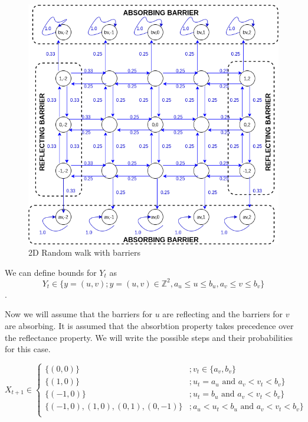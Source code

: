 \documentclass[a4paper]{article}
\begin{document}
\begin{figure}[h]
    \centering
    \includegraphics[width=\textwidth]{2d-bounded.png}
    \caption{2D Random walk with barriers}
    \label{fig:2d-bounded}
\end{figure}

We can define bounds for $Y_t$ as
$$Y_t \in \{y=(u,v); y=(u,v) \in \mathbb{Z}^2, a_u\leq u \leq b_u, a_v \leq v \leq b_v\}$$. 

Now we will assume that the barriers for $u$ are reflecting and the barriers for $v$ are absorbing. It is assumed that the absorbtion property takes precedence over the reflectance property. We will write the possible steps and their probabilities for this case.


\begin{equation*}
    X_{t+1} \in 
    \begin{cases}
    \{(0,0)\} &; v_t \in \{a_v,b_v\}\\
    \{(1,0)\} &; u_t = a_u \textrm{ and }a_v < v_t < b_v\}\\
    \{(-1,0)\} &; u_t = b_u \textrm{ and }a_v < v_t < b_v\}\\
    \{(-1,0), (1,0), (0,1), (0,-1)\} &; a_u < u_t < b_u  \textrm{ and }a_v < v_t < b_v\}\\
    \end{cases}
\end{equation*}
\end{document}
